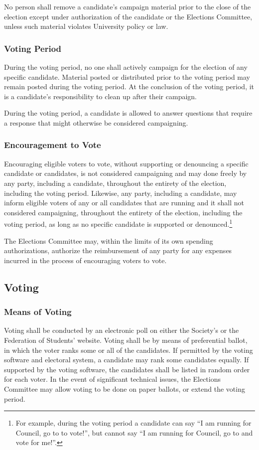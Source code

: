 No person shall remove a candidate's campaign material prior to the close of the election except under authorization of the candidate or the Elections Committee, unless such material violates University policy or law.

\subsubsection{Voting Period}
During the voting period, no one shall actively campaign for the election of any specific candidate.
Material posted or distributed prior to the voting period may remain posted during the voting period.
At the conclusion of the voting period, it is a candidate's responsibility to clean up after their campaign.

During the voting period, a candidate is allowed to answer questions that require a response that might otherwise be considered campaigning.

\subsubsection{Encouragement to Vote}
Encouraging eligible voters to vote, without supporting or denouncing a specific candidate or candidates, is not considered campaigning and may done freely by any party, including a candidate, throughout the entirety of the election, including the voting period.
Likewise, any party, including a candidate, may inform eligible voters of any or all candidates that are running and it shall not considered campaigning, throughout the entirety of the election, including the voting period, as long as no specific candidate is supported or denounced.\footnote{For example, during the voting period a candidate can say ``I am running for Council, go to \votewebsite{} to vote!'', but cannot say ``I am running for Council, go to \votewebsite{} and vote for me!''.}

The Elections Committee may, within the limits of its own spending authorizations, authorize the reimbursement of any party for any expenses incurred in the process of encouraging voters to vote.

\subsection{Voting}
\subsubsection{Means of Voting}
\label{elections:meansOfVoting}
Voting shall be conducted by an electronic poll on either the Society's or the Federation of Students' website.
Voting shall be by means of preferential ballot, in which the voter ranks some or all of the candidates.
If permitted by the voting software and electoral system, a candidate may rank some candidates equally.
If supported by the voting software, the candidates shall be listed in random order for each voter.
In the event of significant technical issues, the Elections Committee may allow voting to be done on paper ballots, or extend the voting period.

